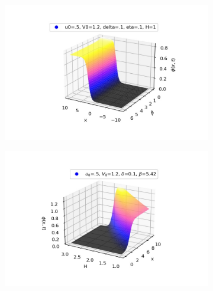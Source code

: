 \documentclass[a4paper, 12pt]{article}
\begin{document}
\begin{figure}[h]
    \begin{subfigure}{0.5\textwidth}
    \centering
    \includegraphics[scale=0.5]{tanh_phivsBeta.jpg}
    \label{plot-beta}
    \end{subfigure}
    \begin{subfigure}{0.5\textwidth}
    \centering
    \includegraphics[scale=0.5]{tanh_phivsH.jpg}
    \label{plot-H}
    \end{subfigure}
    \begin{subfigure}{0.5\textwidth}
    \centering

\end{subfigure}
\end{figure}
\end{document}
